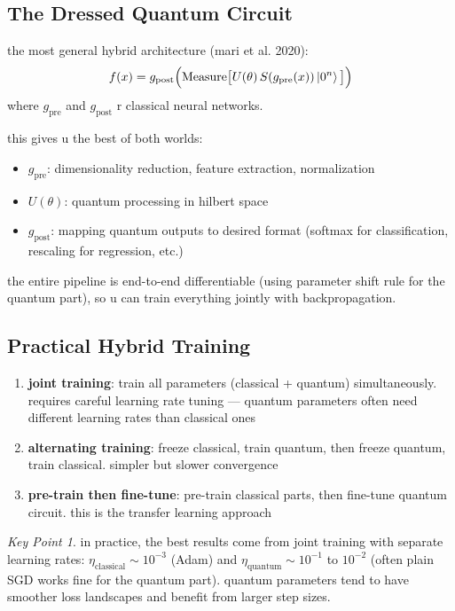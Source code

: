 \documentclass[11pt,a4paper]{article}
\theoremstyle{definition}
\theoremstyle{remark}
\newtheorem*{keypoint}{Key Point}
\begin{document}
\subsection{The Dressed Quantum Circuit}

the most general hybrid architecture (mari et al. 2020):
\begin{equation}
    f(x) = g_{\text{post}}\Big( \text{Measure}\big[ U(\theta) \, S(g_{\text{pre}}(x)) \ket{0^n} \big] \Big)
\end{equation}
where $g_{\text{pre}}$ and $g_{\text{post}}$ r classical neural networks.

this gives u the best of both worlds:
\begin{itemize}
    \item $g_{\text{pre}}$: dimensionality reduction, feature extraction, normalization
    \item $U(\theta)$: quantum processing in hilbert space
    \item $g_{\text{post}}$: mapping quantum outputs to desired format (softmax for classification, rescaling for regression, etc.)
\end{itemize}

the entire pipeline is end-to-end differentiable (using parameter shift rule for the quantum part), so u can train everything jointly with backpropagation.

\subsection{Practical Hybrid Training}

\begin{enumerate}[label=\arabic*.]
    \item \textbf{joint training}: train all parameters (classical + quantum) simultaneously. requires careful learning rate tuning --- quantum parameters often need different learning rates than classical ones
    \item \textbf{alternating training}: freeze classical, train quantum, then freeze quantum, train classical. simpler but slower convergence
    \item \textbf{pre-train then fine-tune}: pre-train classical parts, then fine-tune quantum circuit. this is the transfer learning approach
\end{enumerate}

\begin{keypoint}
in practice, the best results come from joint training with separate learning rates: $\eta_{\text{classical}} \sim 10^{-3}$ (Adam) and $\eta_{\text{quantum}} \sim 10^{-1}$ to $10^{-2}$ (often plain SGD works fine for the quantum part). quantum parameters tend to have smoother loss landscapes and benefit from larger step sizes.
\end{keypoint}
\end{document}
